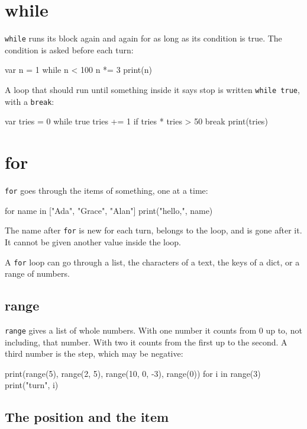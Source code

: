 \section{while}

\verb|while| runs its block again and again for as long as its
condition is true. The condition is asked before each turn:

\begin{zeno}
var n = 1
while n < 100 {
    n *= 3
}
print(n)
\end{zeno}

A loop that should run until something inside it says stop is written
\verb|while true|, with a \verb|break|:

\begin{zeno}
var tries = 0
while true {
    tries += 1
    if tries * tries > 50 {
        break
    }
}
print(tries)
\end{zeno}

\section{for}

\verb|for| goes through the items of something, one at a time:

\begin{zeno}
for name in ["Ada", "Grace", "Alan"] {
    print("hello,", name)
}
\end{zeno}

The name after \verb|for| is new for each turn, belongs to the loop,
and is gone after it. It cannot be given another value inside the
loop.

A \verb|for| loop can go through a list, the characters of a text,
the keys of a dict, or a range of numbers.

\subsection{range}

\verb|range| gives a list of whole numbers. With one number it counts
from 0 up to, not including, that number. With two it counts from the
first up to the second. A third number is the step, which may be
negative:

\begin{zeno}
print(range(5), range(2, 5), range(10, 0, -3), range(0))
for i in range(3) {
    print("turn", i)
}
\end{zeno}

\subsection{The position and the item}

